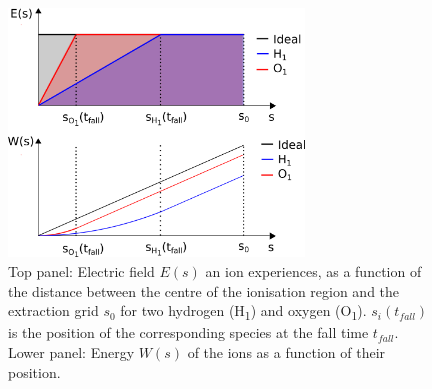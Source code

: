 	\begin{figure}[h] %
		\centering
		\includegraphics[width= 0.7\textwidth]{Bilder/PulsInt.png}
		\caption{Top panel: Electric field $E(s)$ an ion experiences, as a function of the distance between the centre of the ionisation region and the extraction grid $s_0$ for two hydrogen (H\textsubscript{1}) and oxygen (O\textsubscript{1}). $s_i(t_{fall})$ is the position of the corresponding species at the fall time $t_{fall}$. Lower panel: Energy $W(s)$ of the ions as a function of their position.}
		\label{fig:PulsInt}
	\end{figure}

